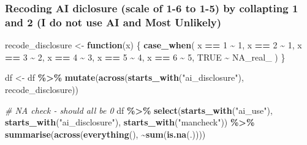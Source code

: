 \documentclass[
]{article}
\newenvironment{Shaded}{\begin{snugshade}}{\end{snugshade}}
\newcommand{\CommentTok}[1]{\textcolor[rgb]{0.56,0.35,0.01}{\textit{#1}}}
\newcommand{\ConstantTok}[1]{\textcolor[rgb]{0.56,0.35,0.01}{#1}}
\newcommand{\ControlFlowTok}[1]{\textcolor[rgb]{0.13,0.29,0.53}{\textbf{#1}}}
\newcommand{\DecValTok}[1]{\textcolor[rgb]{0.00,0.00,0.81}{#1}}
\newcommand{\FunctionTok}[1]{\textcolor[rgb]{0.13,0.29,0.53}{\textbf{#1}}}
\newcommand{\NormalTok}[1]{#1}
\newcommand{\OtherTok}[1]{\textcolor[rgb]{0.56,0.35,0.01}{#1}}
\newcommand{\SpecialCharTok}[1]{\textcolor[rgb]{0.81,0.36,0.00}{\textbf{#1}}}
\newcommand{\StringTok}[1]{\textcolor[rgb]{0.31,0.60,0.02}{#1}}
\begin{document}
\subsubsection{Recoding AI diclosure (scale of 1-6 to 1-5) by collapting
1 and 2 (I do not use AI and Most
Unlikely)}\label{recoding-ai-diclosure-scale-of-1-6-to-1-5-by-collapting-1-and-2-i-do-not-use-ai-and-most-unlikely}

\begin{Shaded}
\begin{Highlighting}[]
\NormalTok{recode\_disclosure }\OtherTok{\textless{}{-}} \ControlFlowTok{function}\NormalTok{(x) \{}
  \FunctionTok{case\_when}\NormalTok{(}
\NormalTok{    x }\SpecialCharTok{==} \DecValTok{1} \SpecialCharTok{\textasciitilde{}} \DecValTok{1}\NormalTok{,}
\NormalTok{    x }\SpecialCharTok{==} \DecValTok{2} \SpecialCharTok{\textasciitilde{}} \DecValTok{1}\NormalTok{,}
\NormalTok{    x }\SpecialCharTok{==} \DecValTok{3} \SpecialCharTok{\textasciitilde{}} \DecValTok{2}\NormalTok{,}
\NormalTok{    x }\SpecialCharTok{==} \DecValTok{4} \SpecialCharTok{\textasciitilde{}} \DecValTok{3}\NormalTok{,}
\NormalTok{    x }\SpecialCharTok{==} \DecValTok{5} \SpecialCharTok{\textasciitilde{}} \DecValTok{4}\NormalTok{,}
\NormalTok{    x }\SpecialCharTok{==} \DecValTok{6} \SpecialCharTok{\textasciitilde{}} \DecValTok{5}\NormalTok{,}
    \ConstantTok{TRUE} \SpecialCharTok{\textasciitilde{}} \ConstantTok{NA\_real\_}
\NormalTok{  )}
\NormalTok{\}}

\NormalTok{df }\OtherTok{\textless{}{-}}\NormalTok{ df }\SpecialCharTok{\%\textgreater{}\%}
  \FunctionTok{mutate}\NormalTok{(}\FunctionTok{across}\NormalTok{(}\FunctionTok{starts\_with}\NormalTok{(}\StringTok{"ai\_disclosure"}\NormalTok{), recode\_disclosure))}

\CommentTok{\# NA check {-} should all be 0}
\NormalTok{df }\SpecialCharTok{\%\textgreater{}\%}
  \FunctionTok{select}\NormalTok{(}\FunctionTok{starts\_with}\NormalTok{(}\StringTok{"ai\_use"}\NormalTok{), }\FunctionTok{starts\_with}\NormalTok{(}\StringTok{"ai\_disclosure"}\NormalTok{),}
         \FunctionTok{starts\_with}\NormalTok{(}\StringTok{"mancheck"}\NormalTok{)) }\SpecialCharTok{\%\textgreater{}\%}
  \FunctionTok{summarise}\NormalTok{(}\FunctionTok{across}\NormalTok{(}\FunctionTok{everything}\NormalTok{(), }\SpecialCharTok{\textasciitilde{}}\FunctionTok{sum}\NormalTok{(}\FunctionTok{is.na}\NormalTok{(.))))}
\end{Highlighting}
\end{Shaded}
\end{document}
